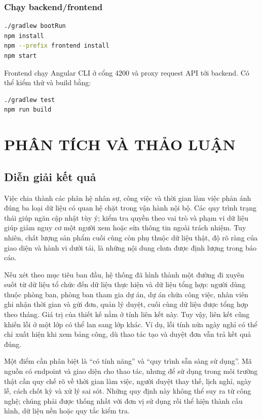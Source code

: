\documentclass[12pt,a4paper,oneside]{report}
\begin{document}
\subsection{Chạy backend/frontend}
\begin{lstlisting}[language=bash]
./gradlew bootRun
npm install
npm --prefix frontend install
npm start
\end{lstlisting}
Frontend chạy Angular CLI ở cổng 4200 và proxy request API tới backend. Có thể kiểm thử và build bằng:
\begin{lstlisting}[language=bash]
./gradlew test
npm run build
\end{lstlisting}

\chapter{PHÂN TÍCH VÀ THẢO LUẬN}
\section{Diễn giải kết quả}
Việc chia thành các phân hệ nhân sự, công việc và thời gian làm việc phản ánh đúng ba loại dữ liệu có quan hệ chặt trong vận hành nội bộ. Các quy trình trạng thái giúp ngăn cập nhật tùy ý; kiểm tra quyền theo vai trò và phạm vi dữ liệu giúp giảm nguy cơ một người xem hoặc sửa thông tin ngoài trách nhiệm. Tuy nhiên, chất lượng sản phẩm cuối cùng còn phụ thuộc dữ liệu thật, độ rõ ràng của giao diện và hành vi dưới tải, là những nội dung chưa được định lượng trong báo cáo.

Nếu xét theo mục tiêu ban đầu, hệ thống đã hình thành một đường đi xuyên suốt từ dữ liệu tổ chức đến dữ liệu thực hiện và dữ liệu tổng hợp: người dùng thuộc phòng ban, phòng ban tham gia dự án, dự án chứa công việc, nhân viên ghi nhận thời gian và gửi đơn, quản lý duyệt, cuối cùng dữ liệu được tổng hợp theo tháng. Giá trị của thiết kế nằm ở tính liên kết này. Tuy vậy, liên kết cũng khiến lỗi ở một lớp có thể lan sang lớp khác. Ví dụ, lỗi tính nửa ngày nghỉ có thể chỉ xuất hiện khi xem bảng công, dù thao tác tạo và duyệt đơn vẫn trả kết quả đúng.

Một điểm cần phân biệt là ``có tính năng'' và ``quy trình sẵn sàng sử dụng''. Mã nguồn có endpoint và giao diện cho thao tác, nhưng để sử dụng trong môi trường thật cần quy chế rõ về thời gian làm việc, người duyệt thay thế, lịch nghỉ, ngày lễ, cách chốt kỳ và xử lý sai sót. Những quy định này không thể suy ra từ công nghệ; chúng phải được thống nhất với đơn vị sử dụng rồi thể hiện thành cấu hình, dữ liệu nền hoặc quy tắc kiểm tra.
\end{document}
